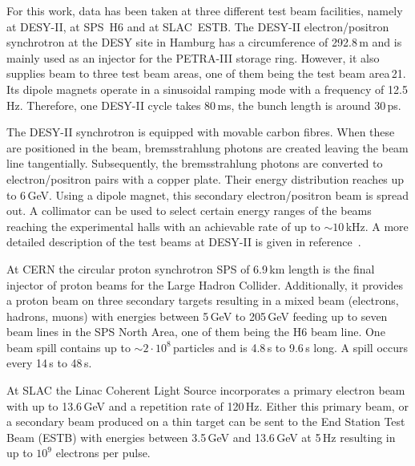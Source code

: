 
For this work, data has been taken at three different test beam facilities, namely at {DESY-II}, at SPS~H6 and at SLAC~ESTB.
The DESY-II electron/positron synchrotron at the DESY site in Hamburg has a circumference of 292.8\,m and is mainly used as an injector for the PETRA-III storage ring. 
However, it also supplies beam to three test beam areas, one  of them being the test beam area\,21.
Its dipole magnets operate in a sinusoidal ramping mode with a frequency of 12.5\,Hz. 
Therefore, one DESY-II cycle takes 80\,ms, the bunch length is around 30\,ps. 

The DESY-II synchrotron is equipped with movable carbon fibres. 
When these are positioned in the beam, bremsstrahlung photons are created leaving the beam line tangentially.
Subsequently, the bremsstrahlung photons are converted to electron/positron pairs with a copper plate. 
Their energy distribution reaches up to 6\,GeV. 
Using a dipole magnet, this secondary electron/positron beam is spread out.
A collimator can be used to select certain energy ranges of the beams reaching the experimental halls with an achievable rate of up to $\sim 10$\,kHz. 
A more detailed description of the test beams at {DESY-II} is given in reference~\cite{EUDET-2007-11}.

At CERN the circular proton synchrotron SPS of 6.9\,km length is the final injector of proton beams for the Large Hadron Collider. 
Additionally, it provides a proton beam on three secondary targets resulting in a mixed beam (electrons, hadrons, muons) with energies between 5\,GeV to 205\,GeV
 feeding up to seven beam lines in the SPS North Area, one of them being the H6 beam line. 
One beam spill contains up to $\sim 2\cdot10^8$\,particles and is 4.8\,s to 9.6\,s long. 
A spill occurs every 14\,s to 48\,s.\,\cite{SPS} 

At SLAC the Linac Coherent Light Source incorporates a primary electron beam with up to 13.6\,GeV and a repetition rate of 120\,Hz.
Either this primary beam, or a secondary beam produced on a thin target can be sent to the End Station Test Beam (ESTB) with energies between 3.5\,GeV and 13.6\,GeV at 5\,Hz
 resulting in up to $10^{9}$ electrons per pulse.\,\cite{SLAC}

